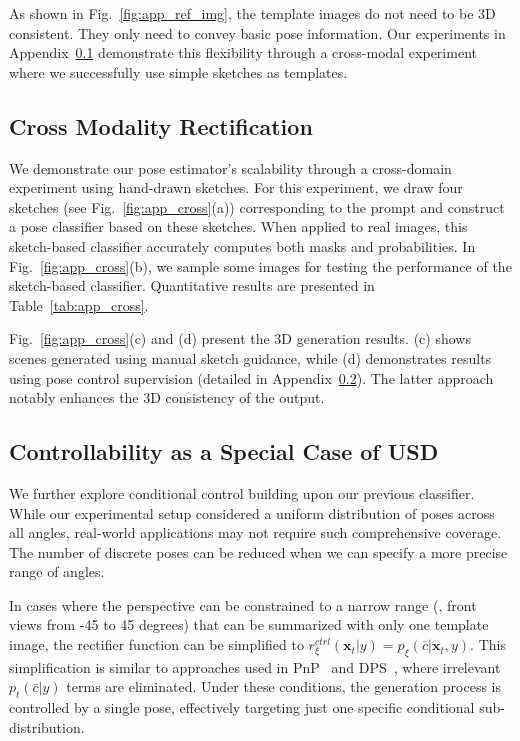As shown in Fig.~\ref{fig:app_ref_img}, the template images do not need to be 3D consistent. They only need to convey basic pose information. Our experiments in Appendix~\ref{app:main_exps_cross} demonstrate this flexibility through a cross-modal experiment where we successfully use simple sketches as templates.



\subsection{Cross Modality Rectification}\label{app:main_exps_cross}
We demonstrate our pose estimator's scalability through a cross-domain experiment using hand-drawn sketches. For this experiment, we draw four sketches (see Fig.~\ref{fig:app_cross}(a)) corresponding to the prompt and construct a pose classifier based on these sketches. When applied to real images, this sketch-based classifier accurately computes both masks and probabilities. In Fig.~\ref{fig:app_cross}(b), we sample some images for testing the performance of the sketch-based classifier. Quantitative results are presented in Table~\ref{tab:app_cross}.

Fig.~\ref{fig:app_cross}(c) and (d) present the 3D generation results. (c) shows scenes generated using manual sketch guidance, while (d) demonstrates results using pose control supervision (detailed in Appendix~\ref{app:main_exps_control}). The latter approach notably enhances the 3D consistency of the output.



\subsection{Controllability as a Special Case of USD}\label{app:main_exps_control}

We further explore conditional control building upon our previous classifier. While our experimental setup considered a uniform distribution of poses across all angles, real-world applications may not require such comprehensive coverage. The number of discrete poses can be reduced when we can specify a more precise range of angles.

In cases where the perspective can be constrained to a narrow range (\eg, front views from -45 to 45 degrees) that can be summarized with only one template image, the rectifier function can be simplified to $r^{ctrl}_\xi(\boldsymbol{x}_t|y) = p_\xi(\bar{c} | \boldsymbol{x}_t, y)$. This simplification is similar to approaches used in PnP~\citep{graikos2022diffusion} and DPS~\citep{chung2022diffusion}, where irrelevant $p_t(\bar{c}|y)$ terms are eliminated. Under these conditions, the generation process is controlled by a single pose, effectively targeting just one specific conditional sub-distribution.

